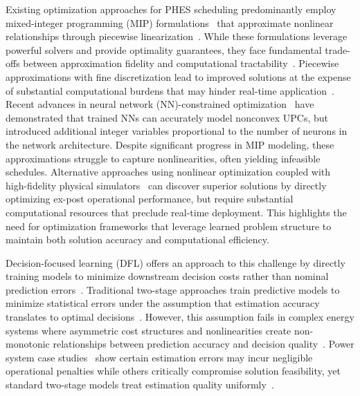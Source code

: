 \documentclass[journal]{IEEEtran}
\begin{document}
Existing optimization approaches for PHES scheduling predominantly employ mixed-integer programming (MIP) formulations~\cite{zhang2025long, jia2013mixed} that approximate nonlinear relationships through piecewise linearization~\cite{toubeau2019non, toubeau2019chance}. While these formulations leverage powerful solvers and provide optimality guarantees, they face fundamental trade-offs between approximation fidelity and computational tractability~\cite{andrade2022integer}. Piecewise approximations with fine discretization lead to improved solutions at the expense of substantial computational burdens that may hinder real-time application~\cite{vielma2010mixed}. Recent advances in neural network (NN)-constrained optimization~\cite{favaro2024neural} have demonstrated that trained NNs can accurately model nonconvex UPCs, but introduced additional integer variables proportional to the number of neurons in the network architecture. Despite significant progress in MIP modeling, these approximations struggle to capture nonlinearities, often yielding infeasible schedules. Alternative approaches using nonlinear optimization coupled with high-fidelity physical simulators~\cite{favaro_multi-fidelity_2024} can discover superior solutions by directly optimizing ex-post operational performance, but require substantial computational resources that preclude real-time deployment. This highlights the need for optimization frameworks that leverage learned problem structure to maintain both solution accuracy and computational efficiency.

Decision-focused learning (DFL) offers an approach to this challenge by directly training models to minimize downstream decision costs rather than nominal prediction errors~\cite{mandi2024decision, elmachtoub2022smart}. Traditional two-stage approaches train predictive models to minimize statistical errors under the assumption that estimation accuracy translates to optimal decisions~\cite{bertsimas2018predictive}. However, this assumption fails in complex energy systems where asymmetric cost structures and nonlinearities create non-monotonic relationships between prediction accuracy and decision quality~\cite{zhang2025decision}. Power system case studies~\cite{zhang2025decision} show certain estimation errors may incur negligible operational penalties while others critically compromise solution feasibility, yet standard two-stage models treat estimation quality uniformly~\cite{demirovic2019investigation}. 
\end{document}
